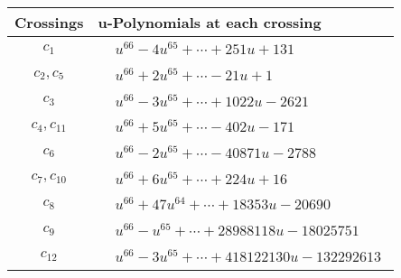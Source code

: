 \documentclass[1p]{elsarticle_modified}
\theoremstyle{definition}
\begin{document}
\begin{tabular}{m{50pt}|m{274pt}}
Crossings & \hspace{64pt}u-Polynomials at each crossing \\
\hline $$\begin{aligned}c_{1}\end{aligned}$$&$\begin{aligned}
&u^{66}-4 u^{65}+\cdots+251 u+131
\end{aligned}$\\
\hline $$\begin{aligned}c_{2},c_{5}\end{aligned}$$&$\begin{aligned}
&u^{66}+2 u^{65}+\cdots-21 u+1
\end{aligned}$\\
\hline $$\begin{aligned}c_{3}\end{aligned}$$&$\begin{aligned}
&u^{66}-3 u^{65}+\cdots+1022 u-2621
\end{aligned}$\\
\hline $$\begin{aligned}c_{4},c_{11}\end{aligned}$$&$\begin{aligned}
&u^{66}+5 u^{65}+\cdots-402 u-171
\end{aligned}$\\
\hline $$\begin{aligned}c_{6}\end{aligned}$$&$\begin{aligned}
&u^{66}-2 u^{65}+\cdots-40871 u-2788
\end{aligned}$\\
\hline $$\begin{aligned}c_{7},c_{10}\end{aligned}$$&$\begin{aligned}
&u^{66}+6 u^{65}+\cdots+224 u+16
\end{aligned}$\\
\hline $$\begin{aligned}c_{8}\end{aligned}$$&$\begin{aligned}
&u^{66}+47 u^{64}+\cdots+18353 u-20690
\end{aligned}$\\
\hline $$\begin{aligned}c_{9}\end{aligned}$$&$\begin{aligned}
&u^{66}- u^{65}+\cdots+28988118 u-18025751
\end{aligned}$\\
\hline $$\begin{aligned}c_{12}\end{aligned}$$&$\begin{aligned}
&u^{66}-3 u^{65}+\cdots+418122130 u-132292613
\end{aligned}$\\
\hline
\end{tabular}\\~\\
\end{document}
